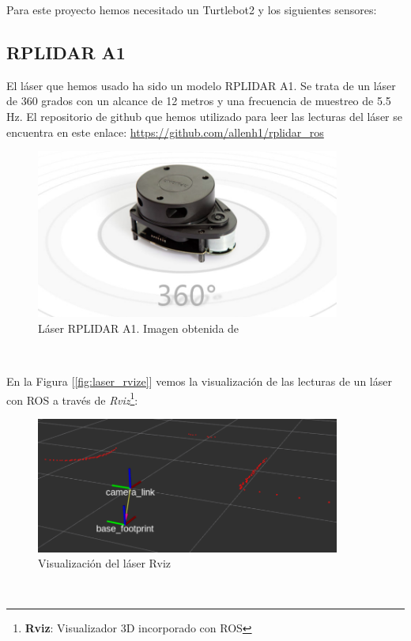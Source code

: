 Para este proyecto hemos necesitado un Turtlebot2 y los siguientes sensores:
\subsection{RPLIDAR A1}
\label{subsec:rplidar_a1}
El láser que hemos usado ha sido un modelo RPLIDAR A1. Se trata de un láser de 360 grados con un alcance de 12 metros y una frecuencia de muestreo de 5.5 Hz. El repositorio de github que hemos utilizado para leer las lecturas del láser se encuentra en este enlace: \url{https://github.com/allenh1/rplidar_ros}\\

\begin{figure} [H]
  \begin{center}
    \includegraphics[width=10cm]{imagenes/cap3/rplidar-a1.png}
  \end{center}
  \caption[Láser RPLIDAR A1]{Láser RPLIDAR A1. Imagen obtenida de \cite{rplidar_a1}}
  \label{fig:rplidar_a1}
\end{figure}\

En la Figura [\ref{fig:laser_rvize}] vemos la visualización de las lecturas de un láser con ROS a través de \textit{Rviz}\footnote{\textbf{Rviz}: Visualizador 3D incorporado con ROS}:\\

\begin{figure} [H]
  \begin{center}
    \includegraphics[width=10cm]{imagenes/cap3/laser-rviz.png}
  \end{center}
  \caption[Visualización del láser en Rviz]{Visualización del láser Rviz}
  \label{fig:laser_rviz}
\end{figure}\

